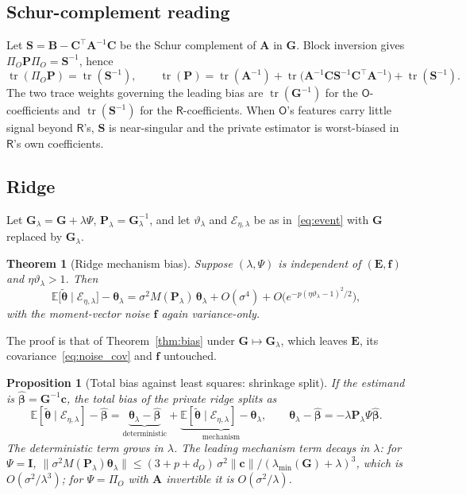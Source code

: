 \documentclass[11pt]{article}
\theoremstyle{definition}
\theoremstyle{plain}
\newtheorem{proposition}{Proposition}[section]
\newtheorem{theorem}{Theorem}[section]
\newcommand{\E}{\mathbb{E}}
\newcommand{\bbeta}{\boldsymbol{\beta}}
\newcommand{\btheta}{\boldsymbol{\theta}}
\newcommand{\bA}{\mathbf{A}}
\newcommand{\bB}{\mathbf{B}}
\newcommand{\bC}{\mathbf{C}}
\newcommand{\bc}{\mathbf{c}}
\newcommand{\bG}{\mathbf{G}}
\newcommand{\bP}{\mathbf{P}}
\newcommand{\bE}{\mathbf{E}}
\newcommand{\bI}{\mathbf{I}}
\newcommand{\bS}{\mathbf{S}}
\newcommand{\bff}{\mathbf{f}}
\newcommand{\Party}[1]{\textsf{#1}}
\newcommand{\Rp}{\Party{R}}
\newcommand{\Op}{\Party{O}}
\newcommand{\PiO}{\Pi_{O}}
\DeclareMathOperator{\tr}{tr}
\begin{document}
\subsection{Schur-complement reading}

Let $\bS = \bB - \bC^{\top}\bA^{-1}\bC$ be the Schur complement of $\bA$ in $\bG$. Block inversion gives $\PiO\bP\PiO = \bS^{-1}$, hence
\begin{equation}
  \tr(\PiO\bP) = \tr(\bS^{-1}), \qquad
  \tr(\bP) = \tr(\bA^{-1}) + \tr\bigl(\bA^{-1}\bC\bS^{-1}\bC^{\top}\bA^{-1}\bigr) + \tr(\bS^{-1}).
  \label{eq:traces}
\end{equation}
The two trace weights governing the leading bias are $\tr(\bG^{-1})$ for the $\Op$-coefficients and $\tr(\bS^{-1})$ for the $\Rp$-coefficients. When $\Op$'s features carry little signal beyond $\Rp$'s, $\bS$ is near-singular and the private estimator is worst-biased in $\Rp$'s own coefficients.

\subsection{Ridge}

Let $\bG_{\lambda} = \bG + \lambda\Psi$, $\bP_{\lambda} = \bG_{\lambda}^{-1}$, and let $\vartheta_{\lambda}$ and $\mathcal{E}_{\eta,\lambda}$ be as in~\eqref{eq:event} with $\bG$ replaced by $\bG_{\lambda}$.

\begin{theorem}[Ridge mechanism bias]
\label{thm:ridge}
Suppose $(\lambda, \Psi)$ is independent of $(\bE, \bff)$ and $\eta\vartheta_{\lambda} > 1$. Then
\[
  \E\bigl[\tilde{\btheta} \mid \mathcal{E}_{\eta,\lambda}\bigr] - \btheta_{\lambda}
  = \sigma^{2} M(\bP_{\lambda})\,\btheta_{\lambda} + O(\sigma^{4}) + O\bigl(e^{-p(\eta\vartheta_{\lambda} - 1)^{2}/2}\bigr),
\]
with the moment-vector noise $\bff$ again variance-only.
\end{theorem}

The proof is that of Theorem~\ref{thm:bias} under $\bG \mapsto \bG_{\lambda}$, which leaves $\bE$, its covariance~\eqref{eq:noise_cov} and $\bff$ untouched.

\begin{proposition}[Total bias against least squares: shrinkage split]
\label{prop:shrink}
If the estimand is $\hat{\bbeta} = \bG^{-1}\bc$, the total bias of the private ridge splits as
\[
  \E[\tilde{\btheta} \mid \mathcal{E}_{\eta,\lambda}] - \hat{\bbeta}
  = \underbrace{\btheta_{\lambda} - \hat{\bbeta}}_{\text{deterministic}}
  + \underbrace{\E[\tilde{\btheta} \mid \mathcal{E}_{\eta,\lambda}] - \btheta_{\lambda}}_{\text{mechanism}},
  \qquad
  \btheta_{\lambda} - \hat{\bbeta} = -\lambda\bP_{\lambda}\Psi\hat{\bbeta}.
\]
The deterministic term grows in $\lambda$. The leading mechanism term decays in $\lambda$: for $\Psi = \bI$, $\|\sigma^2 M(\bP_\lambda)\btheta_\lambda\| \le (3 + p + d_O)\,\sigma^2\|\bc\|/(\lambda_{\min}(\bG) + \lambda)^3$, which is $O(\sigma^2/\lambda^3)$; for $\Psi = \PiO$ with $\bA$ invertible it is $O(\sigma^2/\lambda)$.
\end{proposition}
\end{document}
